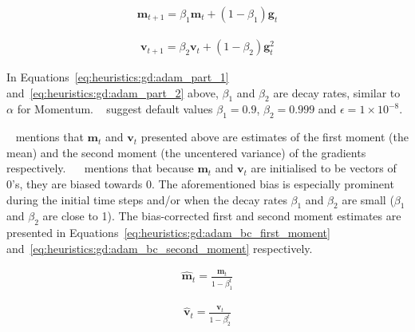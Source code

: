\begin{equation}
	\label{eq:heuristics:gd:adam_part_1}
	\begin{split}
		\boldsymbol{m}_{t+1} = \beta_{1}\boldsymbol{m}_{t} + (1 - \beta_{1})\boldsymbol{g}_{t}
	\end{split}
\end{equation}

\begin{equation}
	\label{eq:heuristics:gd:adam_part_2}
	\begin{split}
		\boldsymbol{v}_{t+1} = \beta_{2}\boldsymbol{v}_{t} + (1 - \beta_{2})\boldsymbol{g}^{2}_{t}
	\end{split}
\end{equation}

In Equations~\eqref{eq:heuristics:gd:adam_part_1} and~\eqref{eq:heuristics:gd:adam_part_2} above, $\beta_{1}$ and $\beta_{2}$ are decay rates, similar to $\alpha$ for \acs{Momentum}. \citeauthor{ref:kingma:2014}~\cite{ref:kingma:2014} suggest default values $\beta_{1}=0.9$, $\beta_{2}=0.999$ and $\epsilon = 1 \times 10^{-8}$.

\citeauthor{ref:ruder:2016}~\cite{ref:ruder:2016} mentions that $\boldsymbol{m}_{t}$ and $\boldsymbol{v}_{t}$ presented above are estimates of the first moment (the mean) and the second moment (the uncentered variance) of the gradients respectively. ~\citeauthor{ref:kingma:2014}~\cite{ref:kingma:2014} mentions that because $\boldsymbol{m}_{t}$ and $\boldsymbol{v}_{t}$ are initialised to be vectors of 0's, they are biased towards 0. The aforementioned bias is especially prominent during the initial time steps and/or when the decay rates $\beta_{1}$ and $\beta_{2}$ are small ($\beta_{1}$ and $\beta_{2}$ are close to 1). The bias-corrected first and second moment estimates are presented in Equations~\eqref{eq:heuristics:gd:adam_bc_first_moment} and~\eqref{eq:heuristics:gd:adam_bc_second_moment} respectively.

\begin{equation}
	\label{eq:heuristics:gd:adam_bc_first_moment}
	\begin{split}
		\hat{\boldsymbol{m}}_{t} = \frac{\boldsymbol{m}_{t}}{1 - \beta^{t}_{1}}
	\end{split}
\end{equation}

\begin{equation}
	\label{eq:heuristics:gd:adam_bc_second_moment}
	\begin{split}
		\hat{\boldsymbol{v}}_{t} = \frac{\boldsymbol{v}_{t}}{1 - \beta^{t}_{2}}
	\end{split}
\end{equation}

